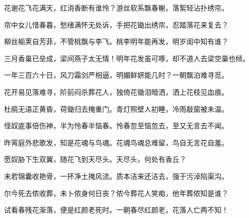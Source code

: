 \begin{poem}
    \begin{pl} 花谢花飞花满天，红消香断有谁怜？游丝软系飘春榭，落絮轻沾扑绣帘。\end{pl}

    \begin{pl} 帘中女儿惜春暮，愁绪满怀无处诉，手把花锄出绣帘，忍踏落花来复去？\end{pl}

    \begin{pl} 柳丝榆荚自芳菲，不管桃飘与李飞。桃李明年能再发，明岁闺中知有谁？\end{pl}

    \begin{pl} 三月香巢已垒成，梁间燕子太无情！明年花发虽可啄，却不道人去梁空巢也倾。\end{pl}

    \begin{pl} 一年三百六十日，风刀霜剑严相逼，明媚鲜妍能几时？一朝飘泊难寻觅。\end{pl}

    \begin{pl} 花开易见落难寻，阶前闷杀葬花人，独倚花锄泪暗洒，洒上花枝见血痕。\end{pl}

    \begin{pl} 杜鹃无语正黄昏，荷锄归去掩重门。青灯照壁人初睡，冷雨敲窗被未温。\end{pl}

    \begin{pl} 怪奴底事倍伤神，半为怜春半恼春。怜春忽至恼忽去，至又无言去不闻。\end{pl}

    \begin{pl} 昨宵庭外悲歌发，知是花魂与鸟魂。花魂鸟魂总难留，鸟自无言花自羞。\end{pl}

    \begin{pl} 愿奴胁下生双翼，随花飞到天尽头。天尽头，何处有香丘？\end{pl}

    \begin{pl} 未若锦囊收艳骨，一抔净土掩风流。质本洁来还洁去，强于污淖陷渠沟。\end{pl}

    \begin{pl} 尔今死去侬收葬，未卜侬身何日丧？侬今葬花人笑痴，他年葬侬知是谁？\end{pl}

    \begin{pl} 试看春残花渐落，便是红颜老死时。一朝春尽红颜老，花落人亡两不知！\end{pl}
\end{poem}


